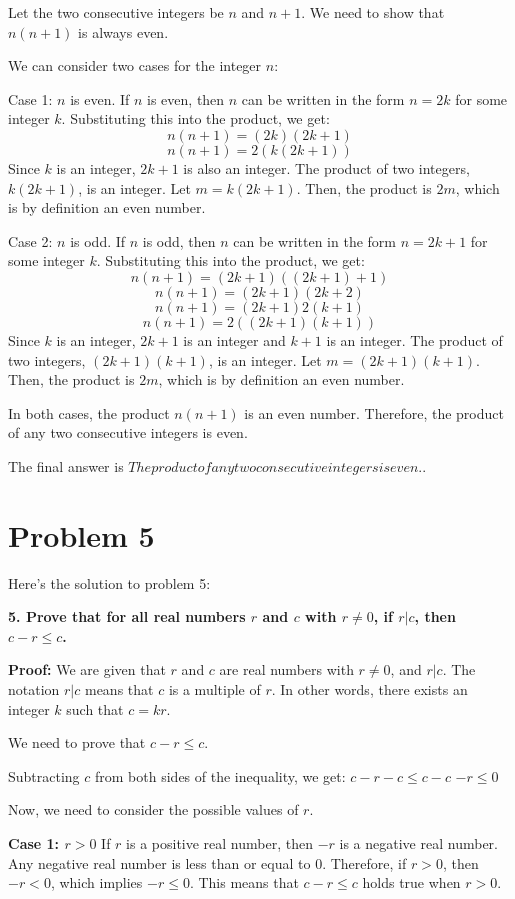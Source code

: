 \documentclass{article}
\begin{document}
Let the two consecutive integers be $n$ and $n+1$. We need to show that $n(n+1)$ is always even.

We can consider two cases for the integer $n$:

Case 1: $n$ is even.
If $n$ is even, then $n$ can be written in the form $n = 2k$ for some integer $k$.
Substituting this into the product, we get:
$$ n(n+1) = (2k)(2k+1) $$
$$ n(n+1) = 2(k(2k+1)) $$
Since $k$ is an integer, $2k+1$ is also an integer. The product of two integers, $k(2k+1)$, is an integer. Let $m = k(2k+1)$. Then, the product is $2m$, which is by definition an even number.

Case 2: $n$ is odd.
If $n$ is odd, then $n$ can be written in the form $n = 2k+1$ for some integer $k$.
Substituting this into the product, we get:
$$ n(n+1) = (2k+1)((2k+1)+1) $$
$$ n(n+1) = (2k+1)(2k+2) $$
$$ n(n+1) = (2k+1)2(k+1) $$
$$ n(n+1) = 2((2k+1)(k+1)) $$
Since $k$ is an integer, $2k+1$ is an integer and $k+1$ is an integer. The product of two integers, $(2k+1)(k+1)$, is an integer. Let $m = (2k+1)(k+1)$. Then, the product is $2m$, which is by definition an even number.

In both cases, the product $n(n+1)$ is an even number. Therefore, the product of any two consecutive integers is even.

The final answer is $\boxed{The product of any two consecutive integers is even.}$.

\newpage

\section*{\textbf{Problem 5}}
Here's the solution to problem 5:

\textbf{5. Prove that for all real numbers $r$ and $c$ with $r \neq 0$, if $r | c$, then $c-r \leq c$.}

\textbf{Proof:}
We are given that $r$ and $c$ are real numbers with $r \neq 0$, and $r | c$.
The notation $r | c$ means that $c$ is a multiple of $r$. In other words, there exists an integer $k$ such that $c = kr$.

We need to prove that $c - r \leq c$.

Subtracting $c$ from both sides of the inequality, we get:
$c - r - c \leq c - c$
$-r \leq 0$

Now, we need to consider the possible values of $r$.

\textbf{Case 1: $r > 0$}
If $r$ is a positive real number, then $-r$ is a negative real number. Any negative real number is less than or equal to 0.
Therefore, if $r > 0$, then $-r < 0$, which implies $-r \leq 0$.
This means that $c - r \leq c$ holds true when $r > 0$.
\end{document}
